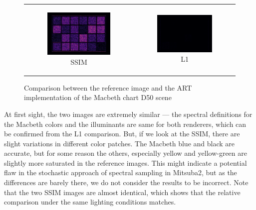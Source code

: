 \begin{figure}[h]
\begin{tabular}{cc}
\begin{subfigure}
			{0.4\textwidth}\centering\includegraphics[width=\linewidth]{img/macbeth_chart_D50_SSIM.png}
			\caption{SSIM}
		\end{subfigure} 
		&
		\begin{subfigure}
			{0.4\textwidth}\centering\includegraphics[width=\linewidth]{img/macbeth_chart_D50_L1.png}
			\caption{L1}
		\end{subfigure}
	\end{tabular}
	\caption{Comparison between the reference image and the ART implementation of the Macbeth chart D50 scene}
	\label{fig:compare_macbeth_d50}
\end{figure}

At first sight, the two images are extremely similar --- the spectral definitions for the Macbeth colors and the illuminants are same for both renderers, which can be confirmed from the L1 comparison. But, if we look at the SSIM, there are slight variations in different color patches. The Macbeth blue and black are accurate, but for some reason the others, especially yellow and yellow-green are slightly more saturated in the reference images. This might indicate a potential flaw in the stochastic approach of spectral sampling in Mitsuba2, but as the differences are barely there, we do not consider the results to be incorrect. Note that the two SSIM images are almost identical, which shows that the relative comparison under the same lighting conditions matches.  

